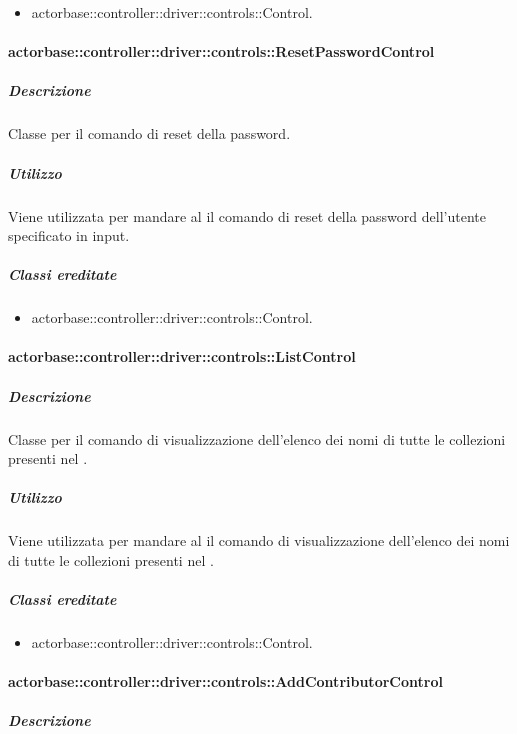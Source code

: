 \documentclass{scalatekids-article}
\begin{document}
\begin{itemize}
\item actorbase::controller::driver::controls::Control.
\end{itemize}

\paragraph{actorbase::controller::driver::controls::ResetPasswordControl}

\subparagraph{Descrizione}

Classe per il comando di reset della password.

\subparagraph{Utilizzo}

Viene utilizzata per mandare al  il comando di reset della password dell'utente specificato in input.

\subparagraph{Classi ereditate}

\begin{itemize}
\item actorbase::controller::driver::controls::Control.
\end{itemize}

\paragraph{actorbase::controller::driver::controls::ListControl}

\subparagraph{Descrizione}

Classe per il comando di visualizzazione dell'elenco dei nomi di tutte le collezioni presenti nel .

\subparagraph{Utilizzo}

Viene utilizzata per mandare al  il comando di visualizzazione dell'elenco dei nomi di tutte le collezioni presenti nel .

\subparagraph{Classi ereditate}

\begin{itemize}
\item actorbase::controller::driver::controls::Control.
\end{itemize}

\paragraph{actorbase::controller::driver::controls::AddContributorControl}

\subparagraph{Descrizione}
\end{document}
